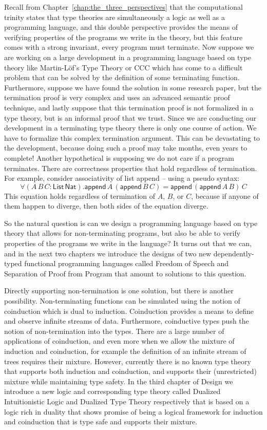 \documentclass[phd,appendix,dedicationpage,ackpage,epigraphpage]{uithesis}
\begin{document}
Recall from Chapter~\ref{chap:the_three_perspectives} that the
computational trinity states that type theories are simultaneously a
logic as well as a programming language, and this double perspective
provides the means of verifying properties of the programs we write in
the theory, but this feature comes with a strong invariant, every
program must terminate.  Now suppose we are working on a large
development in a programming language based on type theory like
Martin-L\"of's Type Theory or CCC which has come to a difficult
problem that can be solved by the definition of some terminating
function.  Furthermore, suppose we have found the solution in some
research paper, but the termination proof is very complex and uses an
advanced semantic proof technique, and lastly suppose that this
termination proof is not formalized in a type theory, but is an
informal proof that we trust.  Since we are conducting our development
in a terminating type theory there is only one course of action.  We
have to formalize this complex termination argument. This can be
devastating to the development, because doing such a proof may take
months, even years to complete!  Another hypothetical is supposing we
do not care if a program terminates.  There are correctness properties
that hold regardless of termination.  For example, consider
associativity of list append -- using a pseudo syntax:
\[ \forall (A\,B\,C :
\mathsf{List}\,\mathsf{Nat}).\mathsf{append}\,A\,(\mathsf{append}\,B\,C)
= \mathsf{append}\,(\mathsf{append}\,A\,B)\,C \] This equation holds
regardless of termination of $A$, $B$, or $C$, because if anyone of
them happen to diverge, then both sides of the equation diverge.  

So the natural question is can we design a programming language based
on type theory that allows for non-terminating programs, but also be
able to verify properties of the programs we write in the language?
It turns out that we can, and in the next two chapters we introduce
the designs of two new dependently-typed functional programming
languages called Freedom of Speech and Separation of Proof from
Program that amount to solutions to this question.

Directly supporting non-termination is one solution, but there is
another possibility.  Non-terminating functions can be simulated using
the notion of coinduction which is dual to induction.  Coinduction
provides a means to define and observe infinite streams of data.
Furthermore, coinductive types push the notion of non-termination into
the types. There are a large number of applications of coinduction,
and even more when we allow the mixture of induction and coinduction,
for example the definition of an infinite stream of trees requires
their mixture.  However, currently there is no known type theory that
supports both induction and coinduction, and supports their
(unrestricted) mixture while maintaining type safety.  In the third
chapter of Design we introduce a new logic and corresponding type
theory called Dualized Intuitionistic Logic and Dualized Type Theory
respectively that is based on a logic rich in duality that shows
promise of being a logical framework for induction and coinduction
that is type safe and supports their mixture.
\end{document}
